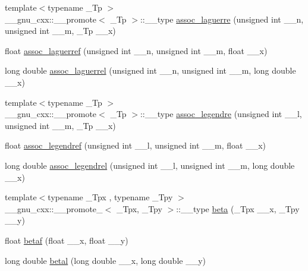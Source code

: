 \begin{DoxyCompactItemize}
\item 
{\footnotesize template$<$typename \+\_\+\+Tp $>$ }\\\+\_\+\+\_\+gnu\+\_\+cxx\+::\+\_\+\+\_\+promote$<$ \+\_\+\+Tp $>$\+::\+\_\+\+\_\+type \hyperlink{group__tr29124__math__spec__func_ga377bb7e038c464a27dfe0573fd2d7b33}{assoc\+\_\+laguerre} (unsigned int \+\_\+\+\_\+n, unsigned int \+\_\+\+\_\+m, \+\_\+\+Tp \+\_\+\+\_\+x)
\item 
float \hyperlink{group__tr29124__math__spec__func_gaf83d98f350a1cfcebee6a1f723cf90d2}{assoc\+\_\+laguerref} (unsigned int \+\_\+\+\_\+n, unsigned int \+\_\+\+\_\+m, float \+\_\+\+\_\+x)
\item 
long double \hyperlink{group__tr29124__math__spec__func_gac8e245671fb2df5de5fd978d03081f6c}{assoc\+\_\+laguerrel} (unsigned int \+\_\+\+\_\+n, unsigned int \+\_\+\+\_\+m, long double \+\_\+\+\_\+x)
\item 
{\footnotesize template$<$typename \+\_\+\+Tp $>$ }\\\+\_\+\+\_\+gnu\+\_\+cxx\+::\+\_\+\+\_\+promote$<$ \+\_\+\+Tp $>$\+::\+\_\+\+\_\+type \hyperlink{group__tr29124__math__spec__func_ga355349f79119c1fd1e2a9351cec57f0f}{assoc\+\_\+legendre} (unsigned int \+\_\+\+\_\+l, unsigned int \+\_\+\+\_\+m, \+\_\+\+Tp \+\_\+\+\_\+x)
\item 
float \hyperlink{group__tr29124__math__spec__func_ga3ced07ddd24bf4af56e2712d148e7f57}{assoc\+\_\+legendref} (unsigned int \+\_\+\+\_\+l, unsigned int \+\_\+\+\_\+m, float \+\_\+\+\_\+x)
\item 
long double \hyperlink{group__tr29124__math__spec__func_ga55977b425a539146f060dec1c8003344}{assoc\+\_\+legendrel} (unsigned int \+\_\+\+\_\+l, unsigned int \+\_\+\+\_\+m, long double \+\_\+\+\_\+x)
\item 
{\footnotesize template$<$typename \+\_\+\+Tpx , typename \+\_\+\+Tpy $>$ }\\\+\_\+\+\_\+gnu\+\_\+cxx\+::\+\_\+\+\_\+promote\+\_$<$ \+\_\+\+Tpx, \+\_\+\+Tpy $>$\+::\+\_\+\+\_\+type \hyperlink{group__tr29124__math__spec__func_gab8661bda2963e98e66bb5a9dc5378ead}{beta} (\+\_\+\+Tpx \+\_\+\+\_\+x, \+\_\+\+Tpy \+\_\+\+\_\+y)
\item 
float \hyperlink{group__tr29124__math__spec__func_gaf577572796d25206ee269c429d04400b}{betaf} (float \+\_\+\+\_\+x, float \+\_\+\+\_\+y)
\item 
long double \hyperlink{group__tr29124__math__spec__func_ga66de58126badd203360010f431fe7f63}{betal} (long double \+\_\+\+\_\+x, long double \+\_\+\+\_\+y)

\end{DoxyCompactItemize}
